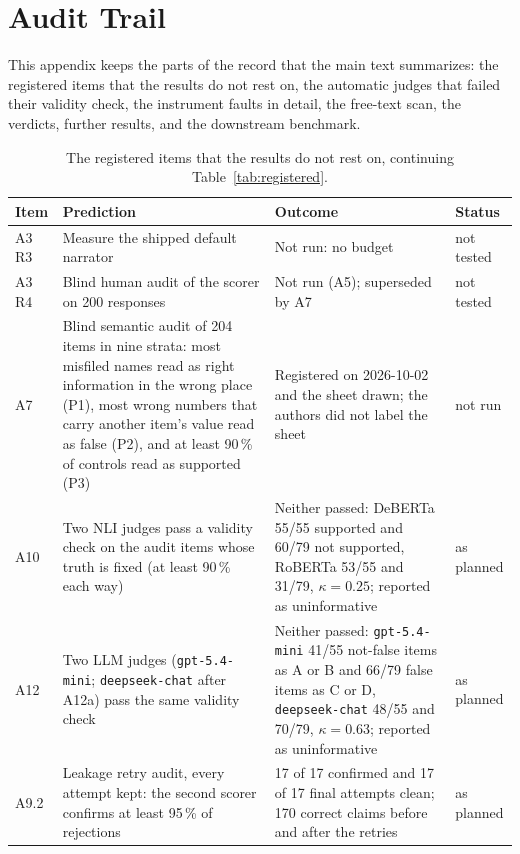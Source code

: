 \documentclass[journal]{IEEEtran}
\begin{document}
\appendices
\section{Audit Trail}\label{app:trail}
\renewcommand{\thetable}{A\arabic{table}}
\setcounter{table}{0}

This appendix keeps the parts of the record that the main text summarizes:
the registered items that the results do not rest on, the automatic judges
that failed their validity check, the instrument faults in detail, the
free-text scan, the verdicts, further results, and the downstream
benchmark.

\begin{table}[!tp]
\caption{The registered items that the results do not rest on, continuing
Table~\ref{tab:registered}.}
\label{tab:registered-more}
\centering
\footnotesize
\setlength{\tabcolsep}{2.4pt}
\begin{tabular}{@{}lp{5.4cm}p{8.9cm}l@{}}
\toprule
Item & Prediction & Outcome & Status \\
\midrule
A3 R3 & Measure the shipped default narrator & Not run: no budget & not tested \\
A3 R4 & Blind human audit of the scorer on 200 responses & Not run (A5); superseded by A7 & not tested \\
A7 & Blind semantic audit of 204 items in nine strata: most misfiled names read as right information in the wrong place (P1), most wrong numbers that carry another item's value read as false (P2), and at least 90\,\% of controls read as supported (P3) & Registered on 2026-10-02 and the sheet drawn; the authors did not label the sheet & not run \\
A10 & Two NLI judges pass a validity check on the audit items whose truth is fixed (at least 90\,\% each way) & Neither passed: DeBERTa 55/55 supported and 60/79 not supported, RoBERTa 53/55 and 31/79, $\kappa=0.25$; reported as uninformative & as planned \\
A12 & Two LLM judges (\texttt{gpt-5.4-mini}; \texttt{deepseek-chat} after A12a) pass the same validity check & Neither passed: \texttt{gpt-5.4-mini} 41/55 not-false items as A or B and 66/79 false items as C or D, \texttt{deepseek-chat} 48/55 and 70/79, $\kappa=0.63$; reported as uninformative & as planned \\
A9.2 & Leakage retry audit, every attempt kept: the second scorer confirms at least 95\,\% of rejections & 17 of 17 confirmed and 17 of 17 final attempts clean; 170 correct claims before and after the retries & as planned \\
\bottomrule
\end{tabular}
\end{table}
\end{document}
